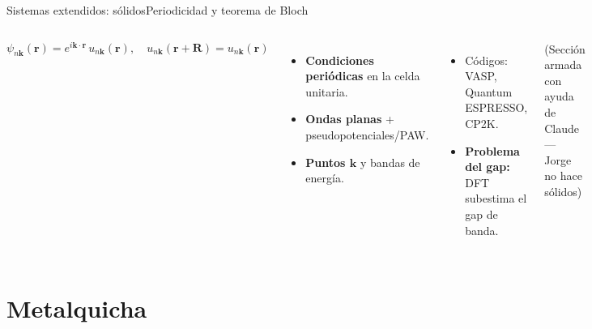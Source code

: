 \documentclass[aspectratio=169]{beamer}
\newcommand{\cplx}[1]{{\footnotesize\color{cookieMuted}#1}}
\newcommand{\vr}{\mathbf{r}}
\begin{document}
\begin{frame}{Sistemas extendidos: sólidos}{Periodicidad y teorema de Bloch}
  \begin{columns}[T,onlytextwidth]
      \[ \psi_{n\mathbf k}(\vr)=e^{i\mathbf k\cdot\vr}\,u_{n\mathbf k}(\vr),\quad u_{n\mathbf k}(\vr+\mathbf R)=u_{n\mathbf k}(\vr) \]
      \begin{itemize}\setlength\itemsep{3pt}
        \item \textbf{Condiciones periódicas} en la celda unitaria.
        \item \textbf{Ondas planas} + pseudopotenciales/PAW.
        \item \textbf{Puntos $\mathbf k$} y bandas de energía.
      \end{itemize}
      \begin{itemize}\setlength\itemsep{3pt}
        \item Códigos: VASP, Quantum ESPRESSO, CP2K.
        \item \textbf{Problema del gap:} DFT subestima el gap de banda.
      \end{itemize}
      \cplx{(Sección armada con ayuda de Claude --- Jorge no hace sólidos)}
  \end{columns}
\end{frame}

\section{Metalquicha}
\end{document}
